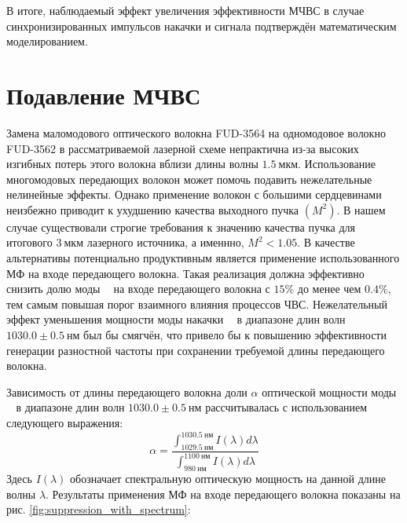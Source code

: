 \documentclass{article}
\DeclareMathOperator{\LPoi}{\text{LP}_{\text{01}}}
\DeclareMathOperator{\LPii}{\text{LP}_{\text{11}}}
\begin{document}
	В итоге, наблюдаемый эффект увеличения эффективности МЧВС в случае синхронизированных импульсов накачки и сигнала подтверждён математическим моделированием.
	
	\section{Подавление МЧВС}
	
	Замена маломодового оптического волокна FUD-3564 на одномодовое волокно FUD-3562 в рассматриваемой лазерной схеме непрактична из-за высоких изгибных потерь этого волокна вблизи длины волны $1.5~\text{мкм}$. Использование многомодовых передающих волокон может помочь подавить нежелательные нелинейные эффекты. Однако применение волокон с большими сердцевинами неизбежно приводит к ухудшению качества выходного пучка $(M^2)$. В нашем случае существовали строгие требования к значению качества пучка для итогового $3~\text{мкм}$ лазерного источника, а именнно, $M^2 < 1.05$. В качестве альтернативы потенциально продуктивным является применение использованного МФ на входе передающего волокна. Такая реализация должна эффективно снизить долю моды $\LPii$ на входе передающего волокна с $15\%$ до менее чем $0.4\%$, тем самым повышая порог взаимного влияния процессов ЧВС. Нежелательный эффект уменьшения мощности моды накачки $\LPoi$ в диапазоне длин волн $1030.0\pm0.5~\text{нм}$ был бы смягчён, что привело бы к повышению эффективности генерации разностной частоты при сохранении требуемой длины передающего волокна.
	
	Зависимость от длины передающего волокна доли $\alpha$ оптической мощности моды $\LPoi$ в диапазоне длин волн $1030.0\pm0.5~\text{нм}$ рассчитывалась с использованием следующего выражения:
	\begin{equation}
		\alpha = \dfrac{\int_{1029.5~\text{нм}}^{1030.5~\text{нм}}{I\left(\lambda\right)d\lambda}}{ \int_{980~\text{нм}}^{1100~\text{нм}}{I\left(\lambda\right)d\lambda}}
		\label{eq:alpha}
	\end{equation}
	Здесь $I\left(\lambda\right)$ обозначает спектральную оптическую мощность на данной длине волны $\lambda$. Результаты применения МФ на входе передающего волокна показаны на рис. \ref{fig:suppression_with_spectrum}:
	
\end{document}
